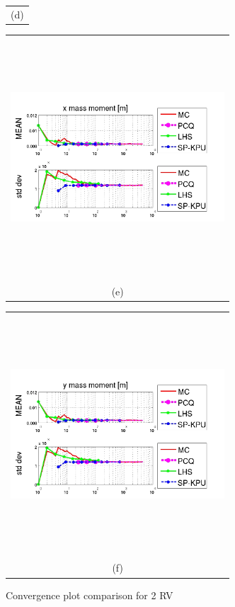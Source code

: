 \documentclass{article}
\newcommand{\Pic}[2][0.85]{\begin{center}\texttt{[image: \#2]}
 \end{center} }
\begin{document}
\begin{figure}[H]
\begin{minipage}[c]{0.6\textwidth}
\begin{tabular}{c}
        (d)
        \end{tabular}
    \end{minipage}    
     \begin{minipage}{0.6\textwidth}
        \begin{tabular}{c}
	\includegraphics[width=8cm,height=9cm,keepaspectratio]{fig/picskpu/cinci_KPU.jpg}\\
        (e)
        \end{tabular}
    \end{minipage}
   \begin{minipage}[c]{0.6\textwidth}
       \begin{tabular}{c}
       \includegraphics[width=8cm,height=9cm,keepaspectratio]{fig/picskpu/sase_KPU.jpg}\\
        (f)
        \end{tabular}
    \end{minipage}
\caption{ Convergence plot comparison for 2 RV }
\label{fig5}  
\end{figure}
\end{document}

